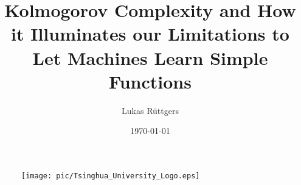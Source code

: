 \documentclass[aspectratio=169, xcolor=dvipsnames]{beamer}
\author{Lukas R\"uttgers}
\title{Kolmogorov Complexity and How it Illuminates our Limitations to Let Machines Learn Simple Functions}
\subtitle{}
\institute{IIIS, Tsinghua University}
\date{\today}
\begin{document}
	
	
	\begin{frame}
		\titlepage
		\begin{figure}[htpb]
			\begin{center}
				\texttt{[image: pic/Tsinghua\_University\_Logo.eps]}
			\end{center}
		\end{figure}
	\end{frame}
	
\end{document}

